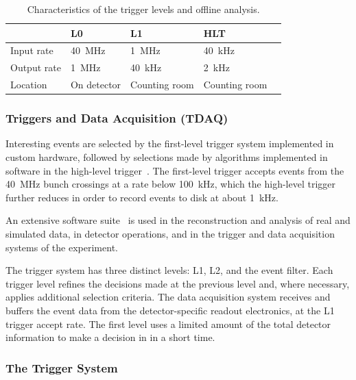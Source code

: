 \begin{table}[bht]
  \footnotesize\centering
  \setlength{\tabcolsep}{0.5em} %
  \caption{Characteristics of the trigger levels and offline analysis.}
  \begin{tabular}{lllll}
                & L0              & L1              & HLT             \\
    \midrule
    Input rate  & \SI{40}{\MHz} & \SI{1}{\MHz}  & \SI{40}{\kHz} \\
    Output rate & \SI{1}{\MHz}  & \SI{40}{\kHz} & \SI{2}{\kHz}  \\
    Location    & On detector     & Counting room   & Counting room   \\
  \end{tabular}
  \label{tab:bg-theory:trigger_details}
\end{table}


\subsubsection{Triggers and Data Acquisition (TDAQ)}







Interesting events are selected by the first-level trigger system implemented in custom hardware,
followed by selections made by algorithms implemented in software in the high-level trigger~\cite{TRIG-2016-01}. 
The first-level trigger accepts events from the \SI{40}{\MHz} bunch crossings at a rate below \SI{100}{\kHz},
which the high-level trigger further reduces in order to record events to disk at about \SI{1}{\kHz}.

An extensive software suite~\cite{ATL-SOFT-PUB-2021-001} is used in the reconstruction and analysis of real
and simulated data, in detector operations, and in the trigger and data acquisition systems of the experiment.


The trigger system has three distinct levels: L1, L2, and the event filter. Each trigger level refines the decisions made at the previous level and, where necessary, applies additional selection criteria. The data acquisition system receives and buffers the event data from the detector-specific readout electronics, at the L1 trigger accept rate. The first level uses a limited amount of the total detector information to make a decision in in a short time.


\subsubsection{The Trigger System}

